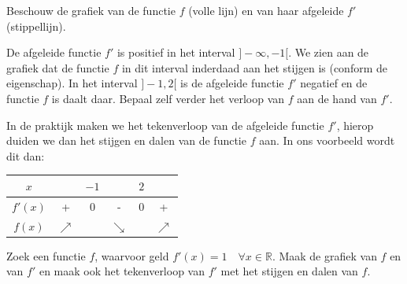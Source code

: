 \documentclass[12pt]{article}
\begin{document}
Beschouw de grafiek van de functie $f$ (volle lijn) en van haar afgeleide $f'$ (stippellijn).
\begin{center}
\end{center}
De afgeleide functie $f'$ is positief in het interval $]-\infty, -1[$. We zien aan de grafiek dat de functie $f$ in dit interval inderdaad aan het stijgen is (conform de eigenschap). In het interval $]-1, 2[$ is de afgeleide functie $f'$ negatief en de functie $f$ is daalt daar. Bepaal zelf verder het verloop van $f$ aan de hand van $f'$.

In de praktijk maken we het tekenverloop van de afgeleide functie $f'$, hierop duiden we dan het stijgen en dalen van de functie $f$ aan. In ons voorbeeld wordt dit dan:
\begin{center}
  \begin{tabular}{c|ccccc}
    $x$ & \hspace*{1.0cm} & $-1$ & \hspace*{1.0cm} & $2$ & \hspace*{1.0cm}\\
    \hline
    $f'(x)$ & + & 0 & - & 0 & +\\
    \hline
    $f(x)$ & $\nearrow$ & & $\searrow$ & & $\nearrow$
  \end{tabular}
\end{center}

\begin{oefening}
  Zoek een functie $f$, waarvoor geld $f'(x)=1\quad \forall x\in\mathbb{R}$. Maak de grafiek van $f$ en van $f'$ en maak ook het tekenverloop van $f'$ met het stijgen en dalen van $f$.
\end{oefening}
\end{document}
